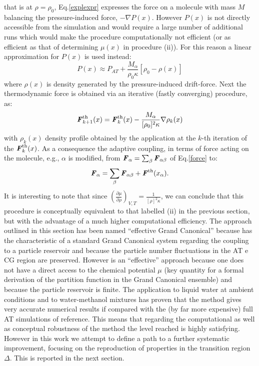 \documentclass[aps,pre,preprint]{revtex4}
\renewcommand{\v}[1]{\textbf{\textit{#1}}}
\begin{document}
that is at $\rho=\rho_{0}$, Eq.\ref{explexpr} expresses the force on a molecule with mass $M$ balancing the pressure-induced force, $-\nabla P(x)$.
However $P(x)$ is not directly accessible from the simulation and would require a large number of additional runs which would make the procedure computationally not efficient (or as efficient as that of determining $\mu(x)$ in procedure (ii)). For this reason a linear approximation for $P(x)$ is used instead:
\begin{equation}
P(x)\approx P_{AT}+\frac{M_{\alpha}}{\rho_{0}\kappa}[\rho_{0}-\rho(x)]
\label{linearapp}
\end{equation}
where $\rho(x)$ is density generated by the pressure-induced drift-force. Next the thermodynamic force is obtained via an iterative (fastly converging) procedure, as:
\begin{equation}
{\v F}_{k+1}^{\textrm{th}}(x)={\v F}_{k}^{\textrm{th}}(x)-\frac{M_{\alpha}}{[\rho_{0}]^{2}\kappa}\nabla\rho_{k}(x)
\label{iter}
\end{equation}
with $\rho_k(x)$ density profile obtained by the application at the $k$-th iteration of the ${\v F}_k^{\textrm{th}}(x)$.
As a consequence the adaptive coupling, in terms of force acting on the molecule, e.g., $\alpha$ is modified, from ${\v F}_{\alpha}=\sum_{\beta}{\v F}_{\alpha\beta}$ of Eq.\ref{force} to:
\begin{equation}
{\v F}_{\alpha}=\sum_{\beta}{\v F}_{\alpha\beta}+{\v F}^{\textrm{th}}(x_{\alpha}).
\label{mody}
\end{equation}
 It is interesting to note that since $\left({\frac{\partial\mu}{\partial\rho}}\right)_{V,T}=\frac{1}{[\rho]^{2}\kappa}$, we can conclude that this procedure is conceptually equivalent to that labelled (ii) in the previous section, but with the advantage of a much higher computational efficiency.
The approach outlined in this section has been named ``effective Grand Canonical'' because has the characteristic of a standard Grand Canonical system regarding the coupling to a particle reservoir and because the particle number fluctuations in the AT e CG region are preserved. However is an ``effective'' approach because one does not have a direct access to the chemical potential $\mu$ (key quantity for a formal derivation of the partition function in the Grand Canonical ensemble) and because the particle reservoir is finite. The application to liquid water at ambient conditions \cite{prlgc} and to water-methanol mixtures \cite{debash} has proven that the method gives very accurate numerical results if compared with the (by far more expensive) full AT simulations of reference. This means that regarding the computational as well as conceptual robustness of the method the level reached is highly satisfying. However in this work we attempt to define a path to a further systematic improvement, focusing on the reproduction of properties in the transition region $\Delta$.
This is reported in the next section.
\end{document}
